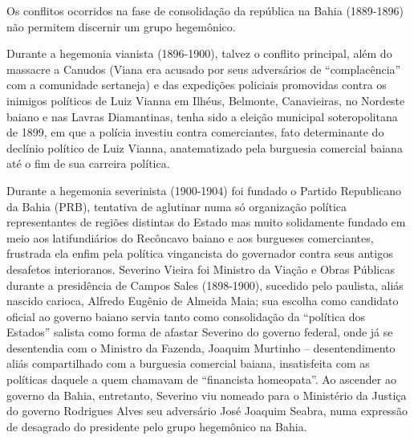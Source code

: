 Os conflitos ocorridos na fase de consolidação da república na Bahia (1889-1896) não permitem discernir um grupo hegemônico.

Durante a hegemonia vianista (1896-1900), talvez o conflito principal, além do massacre a Canudos (Viana era acusado por seus adversários de ``complacência'' com a comunidade sertaneja) e das expedições policiais promovidas contra os inimigos políticos de Luiz Vianna em Ilhéus, Belmonte, Canavieiras, no Nordeste baiano e nas Lavras Diamantinas, tenha sido a eleição municipal soteropolitana de 1899, em que a polícia investiu contra comerciantes, fato determinante do declínio político de Luiz Vianna, anatematizado pela burguesia comercial baiana até o fim de sua carreira política. 

Durante a hegemonia severinista (1900-1904) foi fundado o Partido Republicano da Bahia (PRB), tentativa de aglutinar numa só organização política representantes de regiões distintas do Estado mas muito solidamente fundado em meio aos latifundiários do Recôncavo baiano e aos burgueses comerciantes, frustrada ela enfim pela política vingancista do governador contra seus antigos desafetos interioranos. Severino Vieira foi Ministro da Viação e Obras Públicas durante a presidência de Campos Sales (1898-1900), sucedido pelo paulista, aliás nascido carioca, Alfredo Eugênio de Almeida Maia; sua escolha como candidato oficial ao governo baiano servia tanto como consolidação da ``política dos Estados'' salista como forma de afastar Severino do governo federal, onde já se desentendia com o Ministro da Fazenda, Joaquim Murtinho -- desentendimento aliás compartilhado com a burguesia comercial baiana, insatisfeita com as políticas daquele a quem chamavam de ``financista homeopata''. Ao ascender ao governo da Bahia, entretanto, Severino viu nomeado para o Ministério da Justiça do governo Rodrigues Alves seu adversário José Joaquim Seabra, numa expressão de desagrado do presidente pelo grupo hegemônico na Bahia. 

